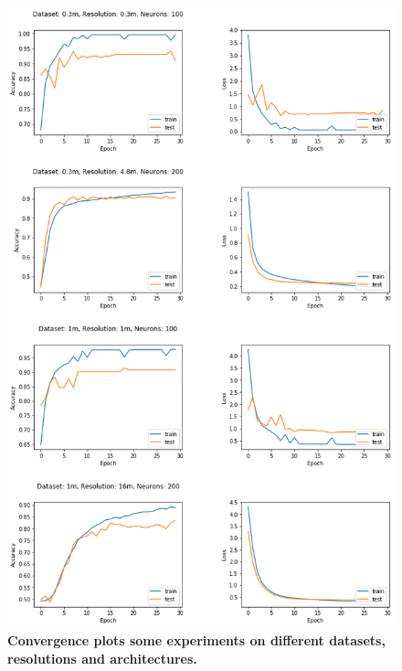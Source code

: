 \begin{figure}[h!]
	\centering
	\includegraphics[width=\textwidth]{Figures/results/convergence_plots_all_res.png}
	\captionsetup{width=1\linewidth}
	\caption{\textbf{Convergence plots some experiments on different datasets, resolutions and architectures.}}
	\label{fig:conv_plots}
\end{figure}


